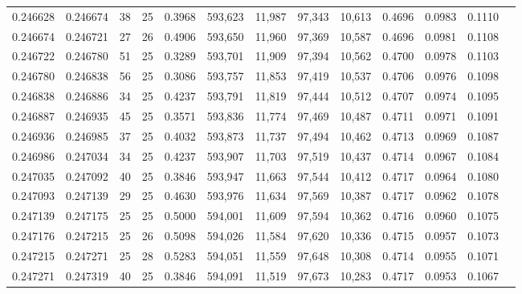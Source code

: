 \begin{tabular}{rrrrrrrrrrrrr}
0.246628 & 0.246674 &    38 &  25 &                                     0.3968 & 593,623 &  11,987 &  97,343 &  10,613 & 0.4696 & 0.0983 & 0.1110 \\
0.246674 & 0.246721 &    27 &  26 &                                     0.4906 & 593,650 &  11,960 &  97,369 &  10,587 & 0.4696 & 0.0981 & 0.1108 \\
0.246722 & 0.246780 &    51 &  25 &                                     0.3289 & 593,701 &  11,909 &  97,394 &  10,562 & 0.4700 & 0.0978 & 0.1103 \\
0.246780 & 0.246838 &    56 &  25 &                                     0.3086 & 593,757 &  11,853 &  97,419 &  10,537 & 0.4706 & 0.0976 & 0.1098 \\
0.246838 & 0.246886 &    34 &  25 &                                     0.4237 & 593,791 &  11,819 &  97,444 &  10,512 & 0.4707 & 0.0974 & 0.1095 \\
0.246887 & 0.246935 &    45 &  25 &                                     0.3571 & 593,836 &  11,774 &  97,469 &  10,487 & 0.4711 & 0.0971 & 0.1091 \\
0.246936 & 0.246985 &    37 &  25 &                                     0.4032 & 593,873 &  11,737 &  97,494 &  10,462 & 0.4713 & 0.0969 & 0.1087 \\
0.246986 & 0.247034 &    34 &  25 &                                     0.4237 & 593,907 &  11,703 &  97,519 &  10,437 & 0.4714 & 0.0967 & 0.1084 \\
0.247035 & 0.247092 &    40 &  25 &                                     0.3846 & 593,947 &  11,663 &  97,544 &  10,412 & 0.4717 & 0.0964 & 0.1080 \\
0.247093 & 0.247139 &    29 &  25 &                                     0.4630 & 593,976 &  11,634 &  97,569 &  10,387 & 0.4717 & 0.0962 & 0.1078 \\
0.247139 & 0.247175 &    25 &  25 &                                     0.5000 & 594,001 &  11,609 &  97,594 &  10,362 & 0.4716 & 0.0960 & 0.1075 \\
0.247176 & 0.247215 &    25 &  26 &                                     0.5098 & 594,026 &  11,584 &  97,620 &  10,336 & 0.4715 & 0.0957 & 0.1073 \\
0.247215 & 0.247271 &    25 &  28 &                                     0.5283 & 594,051 &  11,559 &  97,648 &  10,308 & 0.4714 & 0.0955 & 0.1071 \\
0.247271 & 0.247319 &    40 &  25 &                                     0.3846 & 594,091 &  11,519 &  97,673 &  10,283 & 0.4717 & 0.0953 & 0.1067 \\

\end{tabular}
